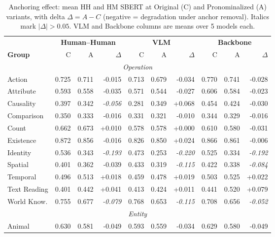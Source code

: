 \begin{table}[ht]
\small\centering
\setlength{\tabcolsep}{4pt}
\caption{Anchoring effect: mean HH and HM SBERT at Original (C) and Pronominalized (A) variants, with delta $\Delta{=}A{-}C$ (negative = degradation under anchor removal). Italics mark $|\Delta|{>}0.05$. VLM and Backbone columns are means over 5 models each.}
\label{tab:anchoring_degradation}
\begin{tabular}{lrrr rrr rrr}
\toprule
 & \multicolumn{3}{c}{\textbf{Human--Human}} & \multicolumn{3}{c}{\textbf{VLM}} & \multicolumn{3}{c}{\textbf{Backbone}} \\
\cmidrule(lr){2-4}\cmidrule(lr){5-7}\cmidrule(lr){8-10}
\textbf{Group} & C & A & $\Delta$ & C & A & $\Delta$ & C & A & $\Delta$ \\
\midrule
\multicolumn{10}{c}{\textit{Operation}} \\
\midrule
Action & 0.725 & 0.711 & -0.015 & 0.713 & 0.679 & -0.034 & 0.770 & 0.741 & -0.028 \\
Attribute & 0.593 & 0.558 & -0.035 & 0.571 & 0.544 & -0.027 & 0.606 & 0.584 & -0.023 \\
Causality & 0.397 & 0.342 & \textit{-0.056} & 0.281 & 0.349 & +0.068 & 0.454 & 0.424 & -0.030 \\
Comparison & 0.350 & 0.333 & -0.016 & 0.331 & 0.321 & -0.010 & 0.344 & 0.329 & -0.016 \\
Count & 0.662 & 0.673 & +0.010 & 0.578 & 0.578 & +0.000 & 0.610 & 0.580 & -0.031 \\
Existence & 0.872 & 0.856 & -0.016 & 0.826 & 0.850 & +0.024 & 0.866 & 0.861 & -0.006 \\
Identity & 0.536 & 0.343 & \textit{-0.193} & 0.473 & 0.253 & \textit{-0.220} & 0.525 & 0.334 & \textit{-0.192} \\
Spatial & 0.401 & 0.362 & -0.039 & 0.433 & 0.319 & \textit{-0.115} & 0.422 & 0.338 & \textit{-0.084} \\
Temporal & 0.496 & 0.513 & +0.018 & 0.459 & 0.478 & +0.019 & 0.503 & 0.525 & +0.022 \\
Text Reading & 0.401 & 0.442 & +0.041 & 0.413 & 0.424 & +0.011 & 0.441 & 0.520 & +0.079 \\
World Know. & 0.755 & 0.677 & \textit{-0.079} & 0.768 & 0.653 & \textit{-0.115} & 0.708 & 0.656 & \textit{-0.052} \\
\midrule
\multicolumn{10}{c}{\textit{Entity}} \\
\midrule
Animal & 0.630 & 0.581 & -0.049 & 0.593 & 0.559 & -0.034 & 0.629 & 0.580 & -0.049 \\

\end{tabular}
\end{table}
